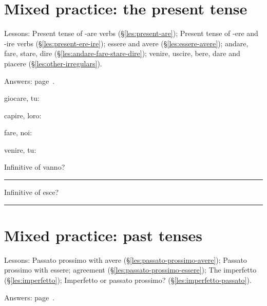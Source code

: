 \documentclass[11pt,a4paper,twoside,openright]{book}
\newcommand{\blank}{\underline{\hspace{2.6cm}}}
\newcommand{\answerline}{\par\vspace{6pt}\noindent\rule{0.75\linewidth}{0.4pt}\par}
\begin{document}
\section{Mixed practice: the present tense}\label{set:mixed-present}
{\small Lessons: Present tense of -are verbs (\S\ref{les:present-are}); Present tense of -ere and -ire verbs (\S\ref{les:present-ere-ire}); essere and avere (\S\ref{les:essere-avere}); andare, fare, stare, dire (\S\ref{les:andare-fare-stare-dire}); venire, uscire, bere, dare and piacere (\S\ref{les:other-irregulars}).}\par
{\color{muted}\small Answers: page~\pageref{ans:set:mixed-present}.}

\begin{exercises}
\item\label{ex:mix-pres-1}\relax giocare, tu: \blank{}
\item\label{ex:mix-pres-2}\relax capire, loro: \blank{}
\item\label{ex:mix-pres-3}\relax fare, noi: \blank{}
\item\label{ex:mix-pres-4}\relax venire, tu: \blank{}
\item\label{ex:mix-pres-5}\relax Infinitive of vanno?\par\answerline
\item\label{ex:mix-pres-6}\relax Infinitive of esce?\par\answerline
\end{exercises}

\section{Mixed practice: past tenses}\label{set:mixed-past}
{\small Lessons: Passato prossimo with avere (\S\ref{les:passato-prossimo-avere}); Passato prossimo with essere; agreement (\S\ref{les:passato-prossimo-essere}); The imperfetto (\S\ref{les:imperfetto}); Imperfetto or passato prossimo? (\S\ref{les:imperfetto-passato}).}\par
{\color{muted}\small Answers: page~\pageref{ans:set:mixed-past}.}
\end{document}
